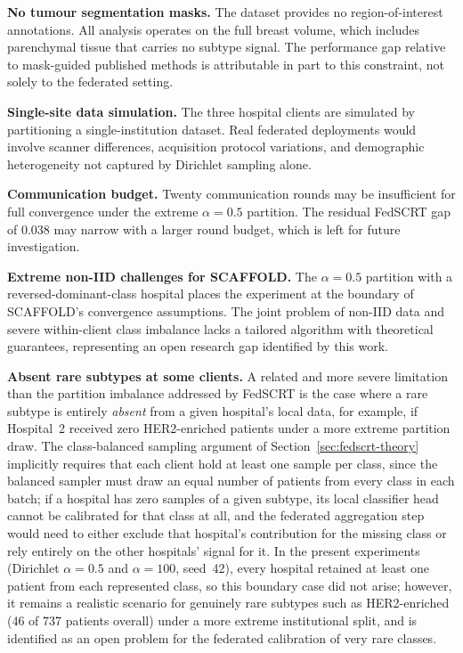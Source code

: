 \textbf{No tumour segmentation masks.}
The dataset provides no region-of-interest annotations.
All analysis operates on the full breast volume, which
includes parenchymal tissue that carries no subtype
signal.
The performance gap relative to mask-guided published
methods is attributable in part to this constraint,
not solely to the federated setting.

\textbf{Single-site data simulation.}
The three hospital clients are simulated by partitioning
a single-institution dataset.
Real federated deployments would involve scanner differences,
acquisition protocol variations, and demographic
heterogeneity not captured by Dirichlet sampling alone.

\textbf{Communication budget.}
Twenty communication rounds may be insufficient for full
convergence under the extreme $\alpha=0.5$ partition.
The residual FedSCRT gap of 0.038 may narrow with a larger
round budget, which is left for future investigation.

\textbf{Extreme non-IID challenges for SCAFFOLD.}
The $\alpha=0.5$ partition with a reversed-dominant-class
hospital places the experiment at the boundary of SCAFFOLD's
convergence assumptions.
The joint problem of non-IID data and severe within-client
class imbalance lacks a tailored algorithm with theoretical
guarantees, representing an open research gap identified
by this work.

\textbf{Absent rare subtypes at some clients.}
A related and more severe limitation than the partition
imbalance addressed by FedSCRT is the case where a rare
subtype is entirely \emph{absent} from a given hospital's
local data, for example, if Hospital~2 received zero
HER2-enriched patients under a more extreme partition
draw.
The class-balanced sampling argument of
Section~\ref{sec:fedscrt-theory} implicitly requires that
each client hold at least one sample per class, since the
balanced sampler must draw an equal number of patients
from every class in each batch; if a hospital has zero
samples of a given subtype, its local classifier head
cannot be calibrated for that class at all, and the
federated aggregation step would need to either exclude
that hospital's contribution for the missing class or
rely entirely on the other hospitals' signal for it.
In the present experiments (Dirichlet $\alpha=0.5$ and
$\alpha=100$, seed~42), every hospital retained at least
one patient from each represented class, so this
boundary case did not arise; however, it remains a
realistic scenario for genuinely rare subtypes such as
HER2-enriched (46 of 737 patients overall) under a more
extreme institutional split, and is identified as an
open problem for the federated calibration of very rare
classes.

